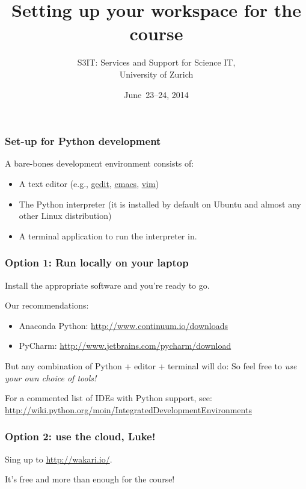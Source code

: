 \documentclass[english,serif,mathserif,xcolor=pdftex,dvipsnames,table]{beamer}
\title[Set-up]{%
  Setting up your workspace for the course
}
\author[S3IT]{%
  S3IT: Services and Support for Science IT, \\
  University of Zurich
}
\date{June~23--24, 2014}
\begin{document}
\maketitle


\begin{frame}
  \frametitle{Set-up for Python development}
  A bare-bones development environment consists of:
  \begin{itemize}
  \item A text editor (e.g.,
    \href{http://en.wikipedia.org/wiki/Gedit}{gedit},
    \href{http://hide1713.wordpress.com/2009/01/30/setup-perfect-python-environment-in-emacs/}{emacs},
    \href{http://blog.dispatched.ch/2009/05/24/vim-as-python-ide/}{vim})
  \item The Python interpreter (it is installed by default on
    Ubuntu and almost any other Linux distribution)
  \item A terminal application to run the interpreter in.
  \end{itemize}
\end{frame}


\begin{frame}[fragile]
  \frametitle{Option 1: Run locally on your laptop}

  Install the appropriate software and you're ready to go.

  \+
  Our recommendations:
  \begin{itemize}
  \item Anaconda Python: {\footnotesize \url{http://www.continuum.io/downloads}}
  \item PyCharm: {\footnotesize \url{http://www.jetbrains.com/pycharm/download}}
  \end{itemize}

  \+
  But any combination of Python + editor + terminal will do: So
  feel free to \emph{use your own choice of tools!}

  \+ {\small For a commented list of {IDEs} with Python support, see:}
  {\footnotesize
    \url{http://wiki.python.org/moin/IntegratedDevelopmentEnvironments}}
\end{frame}


\begin{frame}
  \frametitle{Option 2: use the cloud, Luke!}

  Sing up to \url{http://wakari.io/}.

  \+
  It's free and more than enough for the course!
\end{frame}
\end{document}
